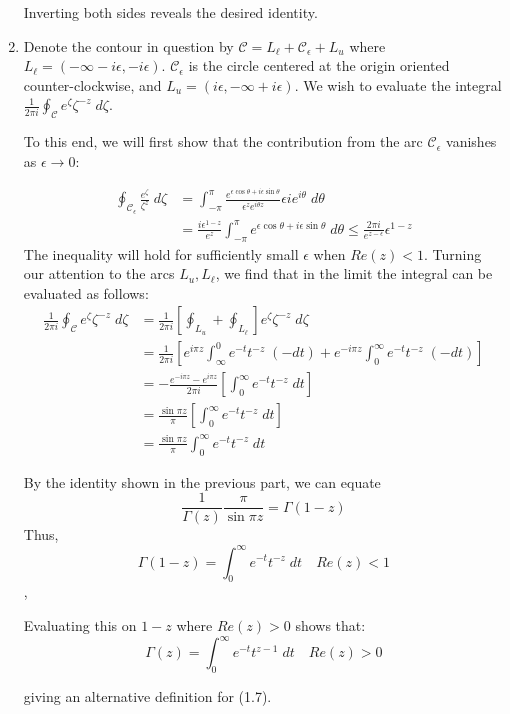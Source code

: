 \documentclass[12pt]{article}%
\newcommand{\C}{\mathcal{C}}
\newcommand{\contint}[1][\mathcal{C}]{\oint_{#1}}
\begin{document}
\begin{enumerate}
  Inverting both sides reveals the desired identity.

  \item
  Denote the contour in question by $\C = L_{\ell} + \C_{\epsilon} + L_u$ where $L_{\ell} = (-\infty - i\epsilon, -i\epsilon)$. $\C_\epsilon$ is the circle centered at the origin oriented counter-clockwise, and $L_u = (i\epsilon, -\infty + i\epsilon)$. We wish to evaluate the integral $\frac{1}{2\pi i}\contint e^{\zeta}\zeta^{-z} \; d\zeta$.

  To this end, we will first show that the contribution from the arc $\C_\epsilon$ vanishes as $\epsilon \rightarrow 0$:

  \begin{align*}
    \oint_{\C_\epsilon} \frac{e^{\zeta}}{\zeta^z} \; d\zeta & = \int_{-\pi}^\pi \frac{e^{\epsilon\cos\theta + i\epsilon\sin\theta}}{\epsilon^ze^{i\theta z}} \epsilon i e^{i\theta} \; d\theta \\[1em]
    & = \frac{i\epsilon^{1-z}}{e^z} \int_{-\pi}^\pi e^{\epsilon\cos\theta + i\epsilon\sin\theta} \; d\theta
    \leq \frac{2\pi i}{e^{z - \epsilon}} \epsilon^{1-z}
  \end{align*}
  The inequality will hold for sufficiently small $\epsilon$ when $Re(z) < 1$. Turning our attention to the arcs $L_u,L_\ell$, we find that in the limit the integral can be evaluated as follows:
  \begin{align*}
     \frac{1}{2 \pi i} \contint e^\zeta \zeta^{-z} \; d\zeta & =  \frac{1}{2 \pi i} \left[\oint_{L_u} + \oint_{L_\ell}\right] e^{\zeta} \zeta^{-z} \; d\zeta \\[1em]
     & = \frac{1}{2 \pi i} \left[e^{i\pi z} \int_{\infty}^0 e^{-t} t^{-z} \; (-dt) + e^{-i\pi z} \int_0^{\infty} e^{-t} t^{-z} \; (-dt)\right] \\[1em]
     & = -\frac{e^{-i\pi z} - e^{i\pi z}}{2\pi i} \left[\int_0^{\infty} e^{-t} t^{-z} \; dt\right]\\
     & = \frac{\sin{\pi z}}{\pi}\left[\int_0^{\infty} e^{-t} t^{-z} \; dt\right] \\[1em]
     & = \frac{\sin{\pi z}}{\pi} \int_0^\infty e^{-t} t^{-z} \; dt
  \end{align*}

  By the identity shown in the previous part, we can equate $$ \frac{1}{\Gamma(z)}\frac{\pi}{\sin{\pi z}} = \Gamma(1 -z)$$ Thus,
  \[\Gamma(1 -z) =  \int_0^\infty e^{-t} t^{-z} \; dt \quad Re(z) < 1\],

  Evaluating this on $1-z$ where $Re(z) > 0$ shows that:
  \[\Gamma(z) = \int_0^\infty e^{-t} t^{z - 1} \; dt \quad Re(z) > 0 \]

  giving an alternative definition for (1.7).
\end{enumerate}
\end{document}
